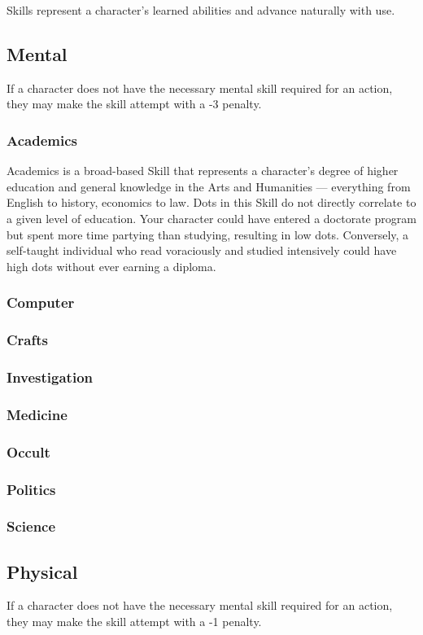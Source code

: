 \documentclass["../Misguided by Starlight.tex"]{subfiles}
\begin{document}
Skills represent a character's learned abilities and advance naturally with use.

\subsection{Mental}
If a character does not have the necessary mental skill required for an action, they may make the skill attempt with a -3 penalty.

\subsubsection{Academics}
Academics is a broad-based Skill that represents a character's degree of higher education and general knowledge
in the Arts and Humanities --- everything from English to history, economics to law. Dots in this Skill do not directly correlate to a given level of education. Your character could have entered a doctorate program but spent more time partying than studying, resulting in low dots. Conversely, a self-taught individual who read voraciously and studied intensively could have high dots without
ever earning a diploma.

\subsubsection{Computer}
\subsubsection{Crafts}
\subsubsection{Investigation}
\subsubsection{Medicine}
\subsubsection{Occult}
\subsubsection{Politics}
\subsubsection{Science}

\subsection{Physical}
If a character does not have the necessary mental skill required for an action, they may make the skill attempt with a -1 penalty.
\end{document}
